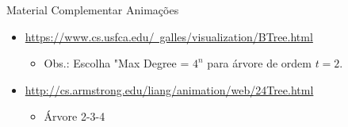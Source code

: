 \documentclass[aspectratio=169]{beamer}
\begin{document}

\begin{frame}{Material Complementar}
Animações
\begin{itemize}
\item \href{https://www.cs.usfca.edu/~galles/visualization/BTree.html}{https://www.cs.usfca.edu/~galles/visualization/BTree.html}
\begin{itemize}
\item Obs.: Escolha "Max Degree = $4^n$ para árvore de ordem $t=2$.
\end{itemize}
\item \href{http://cs.armstrong.edu/liang/animation/web/24Tree.html}{http://cs.armstrong.edu/liang/animation/web/24Tree.html}
\begin{itemize}
\item Árvore 2-3-4
\end{itemize}
\end{itemize}
\end{frame}

\end{document}
